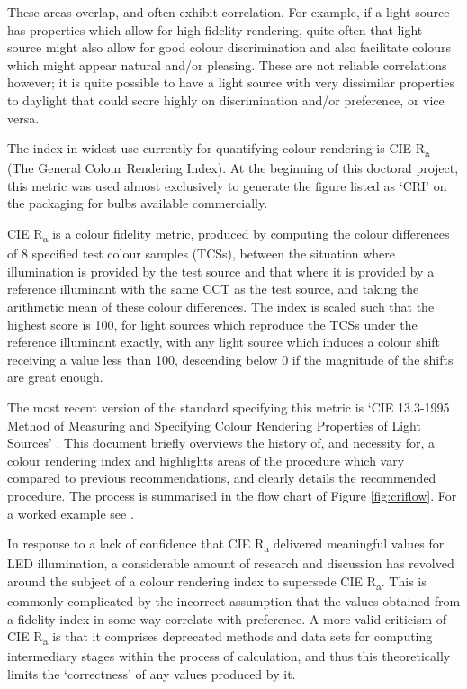These areas overlap, and often exhibit correlation. For example, if a light source has properties which allow for high fidelity rendering, quite often that light source might also allow for good colour discrimination and also facilitate colours which might appear natural and/or pleasing. These are not reliable correlations however; it is quite possible to have a light source with very dissimilar properties to daylight that could score highly on discrimination and/or preference, or vice versa.

The index in widest use currently for quantifying colour rendering is \gls{CIE} R\textsubscript{a} (The General Colour Rendering Index). At the beginning of this doctoral project, this metric was used almost exclusively to generate the figure listed as `CRI' on the packaging for bulbs available commercially. %

\gls{CIE} R\textsubscript{a} is a colour fidelity metric, produced by computing the colour differences of 8 specified test colour samples (TCSs), between the situation where illumination is provided by the test source and that where it is provided by a reference illuminant with the same \gls{CCT} as the test source, and taking the arithmetic mean of these colour differences. The index is scaled such that the highest score is 100, for light sources which reproduce the TCSs under the reference illuminant exactly, with any light source which induces a colour shift receiving a value less than 100, descending below 0 if the magnitude of the shifts are great enough.

The most recent version of the standard specifying this metric is `\gls{CIE} 13.3-1995 Method of Measuring and Specifying Colour Rendering Properties of Light Sources' \citep{cie_cie_1995}. This document briefly overviews the history of, and necessity for, a colour rendering index and highlights areas of the procedure which vary compared to previous recommendations, and clearly details the recommended procedure. The process is summarised in the flow chart of Figure \ref{fig:criflow}. For a worked example see \citet[p.388]{hunt_measuring_2011}.

In response to a lack of confidence that \gls{CIE} R\textsubscript{a} delivered meaningful values for LED illumination, a considerable amount of research and discussion has revolved around the subject of a colour rendering index to supersede \gls{CIE} R\textsubscript{a}. This is commonly complicated by the incorrect assumption that the values obtained from a fidelity index in some way correlate with preference. A more valid criticism of \gls{CIE} R\textsubscript{a} is that it comprises deprecated methods and data sets for computing intermediary stages within the process of calculation, and thus this theoretically limits the `correctness' of any values produced by it.

